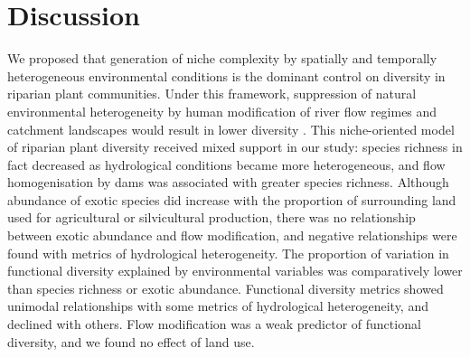 \documentclass[openright,12pt,a4paper]{memoir}
\begin{document}
\section{Discussion}
We proposed that generation of niche complexity by spatially and temporally heterogeneous environmental conditions is the dominant control on diversity in riparian plant communities. Under this framework, suppression of natural environmental heterogeneity by human modification of river flow regimes and catchment landscapes would result in lower diversity \citep{Poff1997, Poff2010}. This niche-oriented model of riparian plant diversity received mixed support in our study: species richness in fact decreased as hydrological conditions became more heterogeneous, and flow homogenisation by dams was associated with greater species richness. Although abundance of exotic species did increase with the proportion of surrounding land used for agricultural or silvicultural production, there was no relationship between exotic abundance and flow modification, and negative relationships were found with metrics of hydrological heterogeneity. The proportion of variation in functional diversity explained by environmental variables was comparatively lower than species richness or exotic abundance. Functional diversity metrics showed unimodal relationships with some metrics of hydrological heterogeneity, and declined with others. Flow modification was a weak predictor of functional diversity, and we found no effect of land use.
\end{document}
